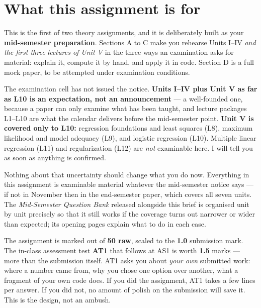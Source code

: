 \documentclass[11pt,a4paper]{article}
\begin{document}

\section*{What this assignment is for}

This is the first of two theory assignments, and it is deliberately built as
your \textbf{mid-semester preparation}. Sections A to C make you rehearse
Units I--IV \emph{and the first three lectures of Unit V} in the three ways an
examination asks for material: explain it, compute it by hand, and apply it in
code. Section D is a full mock paper, to be attempted under examination
conditions.

\begin{warnbox}
The examination cell has not issued the notice. \textbf{Units I--IV plus Unit V as far as
L10 is an expectation, not an announcement} --- a well-founded one, because a
paper can only examine what has been taught, and lecture packages L1--L10 are
what the calendar delivers before the mid-semester point.
\textbf{Unit V is covered only to L10:} regression foundations and least
squares (L8), maximum likelihood and model adequacy (L9), and logistic
regression (L10). Multiple linear regression (L11) and regularization (L12) are
\emph{not} examinable here. I will tell you as soon as anything is confirmed.

Nothing about that uncertainty should change what you do now. Everything in
this assignment is examinable material whatever the mid-semester notice says
--- if not in November then in the end-semester paper, which covers all seven
units. The \emph{Mid-Semester Question Bank} released alongside this brief is
organised unit by unit precisely so that it still works if the coverage turns
out narrower or wider than expected; its opening pages explain what to do in
each case.
\end{warnbox}

\begin{infobox}
The assignment is marked out of \textbf{50 raw}, scaled to the \textbf{1.0}
submission mark. The in-class assessment test \textbf{AT1} that follows at AS1
is worth \textbf{1.5} marks --- more than the submission itself. AT1 asks you
about \emph{your own} submitted work: where a number came from, why you chose
one option over another, what a fragment of your own code does. If you did the
assignment, AT1 takes a few lines per answer. If you did not, no amount of
polish on the submission will save it. This is the design, not an ambush.
\end{infobox}
\end{document}
